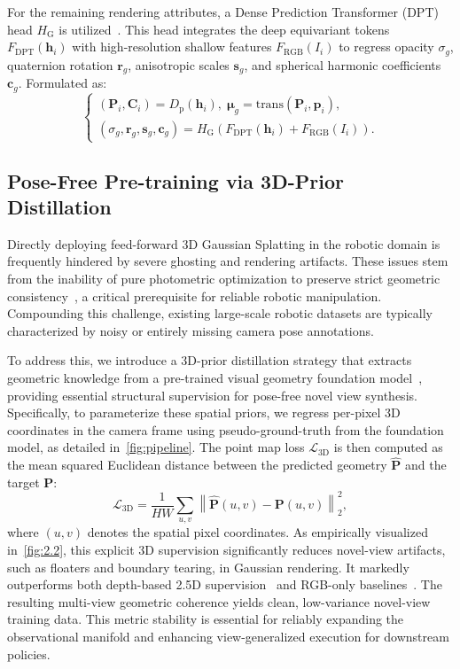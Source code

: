 For the remaining rendering attributes, a Dense Prediction Transformer (DPT) head \(H_\text{G}\) is utilized~\cite{ranftl2021vision}. This head integrates the deep equivariant tokens \(F_{\text{DPT}}(\boldsymbol{h}_i)\) with high-resolution shallow features \(F_{\text{RGB}}(I_i)\) to regress opacity \(\sigma_g\), quaternion rotation \(\boldsymbol{r}_g\), anisotropic scales \(\boldsymbol{s}_g\), and spherical harmonic coefficients \(\boldsymbol{c}_g\). Formulated as:
\begin{equation}
\begin{cases}
    (\boldsymbol{P}_i, \boldsymbol{C}_i) = D_{\text{p}}(\boldsymbol{h}_i),\; \boldsymbol{\mu}_g = \text{trans}(\boldsymbol{P}_i, \boldsymbol{p}_i),  \\
    (\sigma_g, \boldsymbol{r}_g, \boldsymbol{s}_g, \boldsymbol{c}_g) = H_\text{G}(F_{\text{DPT}}(\boldsymbol{h}_i) + F_{\text{RGB}}(I_i)).
\end{cases}
\end{equation}


\subsection{Pose-Free Pre-training via 3D-Prior Distillation} 
Directly deploying feed-forward 3D Gaussian Splatting in the robotic domain is frequently hindered by severe ghosting and rendering artifacts. These issues stem from the inability of pure photometric optimization to preserve strict geometric consistency~\cite{ye2024no}, a critical prerequisite for reliable robotic manipulation. Compounding this challenge, existing large-scale robotic datasets are typically characterized by noisy or entirely missing camera pose annotations. 

To address this, we introduce a 3D-prior distillation strategy that extracts geometric knowledge from a pre-trained visual geometry foundation model~\cite{wang2025pi}, providing essential structural supervision for pose-free novel view synthesis. Specifically, to parameterize these spatial priors, we regress per-pixel 3D coordinates in the camera frame using pseudo-ground-truth from the foundation model, as detailed in~\cref{fig:pipeline}. The point map loss $\mathcal{L}_{\text{3D}}$ is then computed as the mean squared Euclidean distance between the predicted geometry $\hat{\boldsymbol{P}}$ and the target $\boldsymbol{P}$:
\begin{equation}
    \mathcal{L}_{\text{3D}} = \frac{1}{HW} \sum_{u,v} \left\| \hat{\boldsymbol{P}}(u,v) - \boldsymbol{P}(u,v) \right\|_2^2,
\end{equation}
where $(u,v)$ denotes the spatial pixel coordinates. As empirically visualized in~\cref{fig:2.2}, this explicit 3D supervision significantly reduces novel-view artifacts, such as floaters and boundary tearing, in Gaussian rendering. It markedly outperforms both depth-based 2.5D supervision~\cite{jiang2025anysplat,sun2025uni3r} and RGB-only baselines~\cite{fan2024instantsplat,ye2024no}. The resulting multi-view geometric coherence yields clean, low-variance novel-view training data. This metric stability is essential for reliably expanding the observational manifold and enhancing view-generalized execution for downstream policies.

